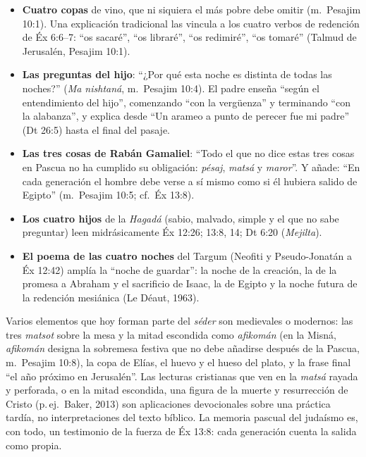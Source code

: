 \documentclass[11pt,letterpaper]{article}
\begin{document}
\begin{itemize}\setlength{\itemsep}{2pt}
\item \textbf{Cuatro copas} de vino, que ni siquiera el más pobre debe omitir (m.~Pesajim 10:1). Una explicación tradicional las vincula a los cuatro verbos de redención de Éx 6:6--7: ``os sacaré'', ``os libraré'', ``os redimiré'', ``os tomaré'' (Talmud de Jerusalén, Pesajim 10:1).
\item \textbf{Las preguntas del hijo}: ``¿Por qué esta noche es distinta de todas las noches?'' (\emph{Ma nishtaná}, m.~Pesajim 10:4). El padre enseña ``según el entendimiento del hijo'', comenzando ``con la vergüenza'' y terminando ``con la alabanza'', y explica desde ``Un arameo a punto de perecer fue mi padre'' (Dt 26:5) hasta el final del pasaje.
\item \textbf{Las tres cosas de Rabán Gamaliel}: ``Todo el que no dice estas tres cosas en Pascua no ha cumplido su obligación: \emph{pésaj}, \emph{matsá} y \emph{maror}''. Y añade: ``En cada generación el hombre debe verse a sí mismo como si él hubiera salido de Egipto'' (m.~Pesajim 10:5; cf.\ Éx 13:8).

\item \textbf{Los cuatro hijos} de la \emph{Hagadá} (sabio, malvado, simple y el que no sabe preguntar) leen midrásicamente Éx 12:26; 13:8, 14; Dt 6:20 (\emph{Mejilta}).
\item \textbf{El poema de las cuatro noches} del Targum (Neofiti y Pseudo-Jonatán a Éx 12:42) amplía la ``noche de guardar'': la noche de la creación, la de la promesa a Abraham y el sacrificio de Isaac, la de Egipto y la noche futura de la redención mesiánica (Le Déaut, 1963).
\end{itemize}

\begin{nota}
Varios elementos que hoy forman parte del \emph{séder} son medievales o modernos: las tres \emph{matsot} sobre la mesa y la mitad escondida como \emph{afikomán} (en la Misná, \emph{afikomán} designa la sobremesa festiva que no debe añadirse después de la Pascua, m.~Pesajim 10:8), la copa de Elías, el huevo y el hueso del plato, y la frase final ``el año próximo en Jerusalén''. Las lecturas cristianas que ven en la \emph{matsá} rayada y perforada, o en la mitad escondida, una figura de la muerte y resurrección de Cristo (p.\,ej.\ Baker, 2013) son aplicaciones devocionales sobre una práctica tardía, no interpretaciones del texto bíblico. La memoria pascual del judaísmo es, con todo, un testimonio de la fuerza de Éx 13:8: cada generación cuenta la salida como propia.
\end{nota}
\end{document}
